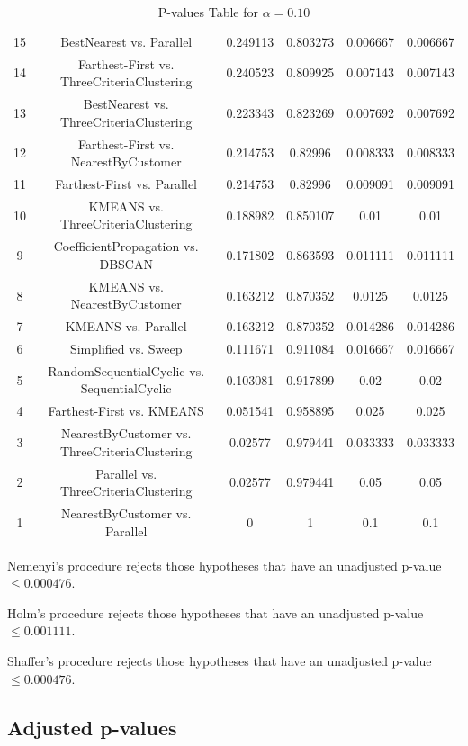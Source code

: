 \documentclass[a4paper,10pt]{article}
\begin{document}
\begin{landscape}
\begin{table}[!htp]
\begin{tabular}{cccccc}
15&BestNearest vs. Parallel&0.249113&0.803273&0.006667&0.006667\\
14&Farthest-First vs. ThreeCriteriaClustering&0.240523&0.809925&0.007143&0.007143\\
13&BestNearest vs. ThreeCriteriaClustering&0.223343&0.823269&0.007692&0.007692\\
12&Farthest-First vs. NearestByCustomer&0.214753&0.82996&0.008333&0.008333\\
11&Farthest-First vs. Parallel&0.214753&0.82996&0.009091&0.009091\\
10&KMEANS vs. ThreeCriteriaClustering&0.188982&0.850107&0.01&0.01\\
9&CoefficientPropagation vs. DBSCAN&0.171802&0.863593&0.011111&0.011111\\
8&KMEANS vs. NearestByCustomer&0.163212&0.870352&0.0125&0.0125\\
7&KMEANS vs. Parallel&0.163212&0.870352&0.014286&0.014286\\
6&Simplified vs. Sweep&0.111671&0.911084&0.016667&0.016667\\
5&RandomSequentialCyclic vs. SequentialCyclic&0.103081&0.917899&0.02&0.02\\
4&Farthest-First vs. KMEANS&0.051541&0.958895&0.025&0.025\\
3&NearestByCustomer vs. ThreeCriteriaClustering&0.02577&0.979441&0.033333&0.033333\\
2&Parallel vs. ThreeCriteriaClustering&0.02577&0.979441&0.05&0.05\\
1&NearestByCustomer vs. Parallel&0&1&0.1&0.1\\
\hline
\end{tabular}
\caption{P-values Table for $\alpha=0.10$}
\end{table}Nemenyi's procedure rejects those hypotheses that have an unadjusted p-value $\le0.000476$.

Holm's procedure rejects those hypotheses that have an unadjusted p-value $\le0.001111$.

Shaffer's procedure rejects those hypotheses that have an unadjusted p-value $\le0.000476$.

\pagebreak

\subsection{Adjusted p-values}


\end{landscape}
\end{document}

